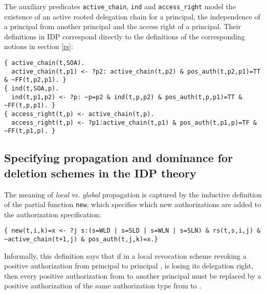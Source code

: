 \documentclass[runningheads]{llncs}
\begin{document}
The auxiliary predicates \texttt{active\_{}chain}, \texttt{ind} and \texttt{access\_{}right} model the existence of an active rooted delegation chain for a principal, the independence of a principal from another principal and the access right of a principal. Their definitions in IDP correspond directly to the definitions of the corresponding notions in section \ref{rs}:
\begin{lstlisting}[caption={The definitions of the auxiliary predicates},label={auxiliary}]
{ active_chain(t,SOA).
  active_chain(t,p1) <- ?p2: active_chain(t,p2) & pos_auth(t,p2,p1)=TT & ~FF(t,p2,p1). }
{ ind(t,SOA,p).
  ind(t,p1,p2) <- ?p: ~p=p2 & ind(t,p,p2) & pos_auth(t,p,p1)=TT & ~FF(t,p,p1). }
{ access_right(t,p) <- active_chain(t,p).
  access_right(t,p) <- ?p1:active_chain(t,p1) & pos_auth(t,p1,p)=TF & ~FF(t,p1,p). }	
\end{lstlisting}

\subsection{Specifying propagation and dominance for deletion schemes in the IDP theory}
The meaning of \emph{local} vs. \emph{global} propagation is captured by the inductive definition of the partial function \texttt{new}, which specifies which new authorizations are added to the authorization specification:
\begin{lstlisting}[caption={The definition of \texttt{new} captures the propagation dimension},label={new}]
{ new(t,i,k)=x <- ?j s:(s=WLD | s=SLD | s=WLN | s=SLN) & rs(t,s,i,j) & ~active_chain(t+1,j) & pos_auth(t,j,k)=x.}
\end{lstlisting}
Informally, this definition says that if in a local revocation scheme revoking a positive authorization from principal  to principal ,  is losing its delegation right, then every positive authorization from  to another principal  must be replaced by a positive authorization of the same authorization type  from  to . 
\end{document}
